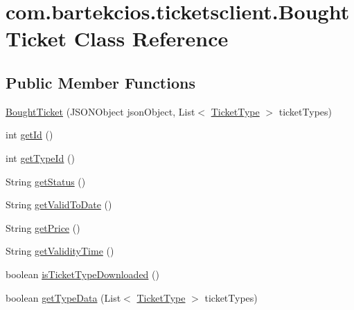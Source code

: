 \hypertarget{classcom_1_1bartekcios_1_1ticketsclient_1_1_bought_ticket}{}\section{com.\+bartekcios.\+ticketsclient.\+Bought\+Ticket Class Reference}
\label{classcom_1_1bartekcios_1_1ticketsclient_1_1_bought_ticket}
\subsection*{Public Member Functions}
\begin{DoxyCompactItemize}
\item 
\hyperlink{classcom_1_1bartekcios_1_1ticketsclient_1_1_bought_ticket_ae17121a3a3e70f1eb01341241203d3ee}{Bought\+Ticket} (J\+S\+O\+N\+Object json\+Object, List$<$ \hyperlink{classcom_1_1bartekcios_1_1ticketsclient_1_1_ticket_type}{Ticket\+Type} $>$ ticket\+Types)
\item 
int \hyperlink{classcom_1_1bartekcios_1_1ticketsclient_1_1_bought_ticket_a83bbd284879fcc52e9c1a53e104a2ea4}{get\+Id} ()
\item 
int \hyperlink{classcom_1_1bartekcios_1_1ticketsclient_1_1_bought_ticket_af9b4cc0e90fc5d63c3d956bad17d1dcb}{get\+Type\+Id} ()
\item 
String \hyperlink{classcom_1_1bartekcios_1_1ticketsclient_1_1_bought_ticket_a1d031a2a46e6f0cc55b127e0e9544527}{get\+Status} ()
\item 
String \hyperlink{classcom_1_1bartekcios_1_1ticketsclient_1_1_bought_ticket_a9642f4b0786346d8f8db7889486cea00}{get\+Valid\+To\+Date} ()
\item 
String \hyperlink{classcom_1_1bartekcios_1_1ticketsclient_1_1_bought_ticket_acaa76bbbfad27552e7486f8b09c3045a}{get\+Price} ()
\item 
String \hyperlink{classcom_1_1bartekcios_1_1ticketsclient_1_1_bought_ticket_a324f1da33b4555c4112f56bb9eb869b6}{get\+Validity\+Time} ()
\item 
boolean \hyperlink{classcom_1_1bartekcios_1_1ticketsclient_1_1_bought_ticket_acb27be4a00747569e470230f07329bb1}{is\+Ticket\+Type\+Downloaded} ()
\item 
boolean \hyperlink{classcom_1_1bartekcios_1_1ticketsclient_1_1_bought_ticket_a906e441fb4b6aa098af29012c9a5f973}{get\+Type\+Data} (List$<$ \hyperlink{classcom_1_1bartekcios_1_1ticketsclient_1_1_ticket_type}{Ticket\+Type} $>$ ticket\+Types)
\end{DoxyCompactItemize}


